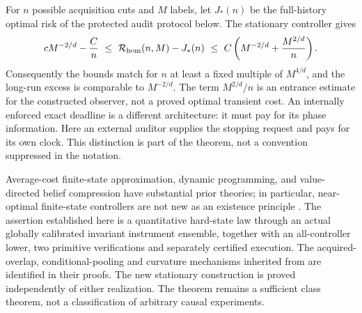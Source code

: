 For $n$ possible acquisition cuts and $M$ labels, let $J_*(n)$ be the full-history optimal risk of the protected audit protocol below. The stationary controller gives
\[
 cM^{-2/d}-\frac{C}{n}
 \ \le\ \mathcal R_{\rm hom}(n,M)-J_*(n)
 \ \le\ C\left(M^{-2/d}+\frac{M^{2/d}}{n}\right).
\]
Consequently the bounds match for $n$ at least a fixed multiple of $M^{4/d}$, and the long-run excess is comparable to $M^{-2/d}$. The term $M^{2/d}/n$ is an entrance estimate for the constructed observer, not a proved optimal transient cost. An internally enforced exact deadline is a different architecture: it must pay for its phase information. Here an external auditor supplies the stopping request and pays for its own clock. This distinction is part of the theorem, not a convention suppressed in the notation.

Average-cost finite-state approximation, dynamic programming, and value-directed belief compression have substantial prior theories; in particular, near-optimal finite-state controllers are not new as an existence principle \cite{YuBertsekas2008,BMT2001,DKY2024,PB2002}. The assertion established here is a quantitative hard-state law through an actual globally calibrated invariant instrument ensemble, together with an all-controller lower, two primitive verifications and separately certified execution. The acquired-overlap, conditional-pooling and curvature mechanisms inherited from \cite{GTFBayes,GTFControlled} are identified in their proofs. The new stationary construction is proved independently of either realization. The theorem remains a sufficient class theorem, not a classification of arbitrary causal experiments.
